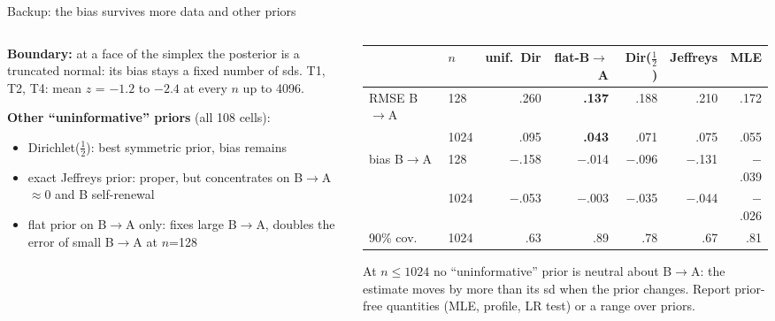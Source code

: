 \documentclass[aspectratio=169,11pt]{beamer}
\newcommand{\BA}{B$\to$A}
\newcommand{\take}[1]{\begin{block}{}\small #1\end{block}}
\begin{document}
\begin{frame}{Backup: the bias survives more data and other priors}
\begin{columns}[T]
\begin{column}{0.44\textwidth}\small
\textbf{Boundary:} at a face of the simplex the posterior is a truncated normal: its bias stays a fixed number of sds. T1, T2, T4: mean $z$ = $-1.2$ to $-2.4$ at every $n$ up to 4096.

\medskip
\textbf{Other ``uninformative'' priors} (all 108 cells):
\begin{itemize}
\item Dirichlet($\tfrac12$): best symmetric prior, bias remains
\item exact Jeffreys prior: proper, but concentrates on \BA{} $\approx 0$ and B self-renewal
\item flat prior on \BA{} only: fixes large \BA, doubles the error of small \BA{} at $n$=128
\end{itemize}
\end{column}
\begin{column}{0.54\textwidth}
{\scriptsize\setlength{\tabcolsep}{3pt}
\begin{tabular}{@{}llrrrrr@{}}\toprule
 & $n$ & unif.\ Dir & flat-\BA & Dir($\tfrac12$) & Jeffreys & MLE \\\midrule
RMSE \BA & 128 & .260 & \textbf{.137} & .188 & .210 & .172 \\
 & 1024 & .095 & \textbf{.043} & .071 & .075 & .055 \\
bias \BA & 128 & $-$.158 & $-$.014 & $-$.096 & $-$.131 & $-$.039 \\
 & 1024 & $-$.053 & $-$.003 & $-$.035 & $-$.044 & $-$.026 \\
90\% cov. & 1024 & .63 & .89 & .78 & .67 & .81 \\\bottomrule
\end{tabular}}
\take{At $n \le 1024$ no ``uninformative'' prior is neutral about \BA: the estimate moves by more than its sd when the prior changes. Report prior-free quantities (MLE, profile, LR test) or a range over priors.}
\end{column}
\end{columns}
\end{frame}
\end{document}
